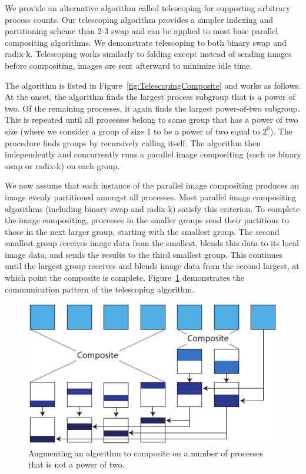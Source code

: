 \documentclass{sig-alternate}
\begin{document}
We provide an alternative algorithm called telescoping for supporting
arbitrary process counts.  Our telescoping algorithm provides a simpler
indexing and partitioning scheme than 2-3 swap and can be applied to most
base parallel compositing algorithms.  We demonstrate telescoping to both
binary swap and radix-k.  Telescoping works similarly to folding except
instead of sending images before compositing, images are sent afterward to
minimize idle time.

The  algorithm is listed in
Figure~\ref{fig:TelescopingComposite} and works as follows.  At the onset,
the algorithm finds the largest process subgroup that is a power of two.
Of the remaining processes, it again finds the largest power-of-two
subgroup.  This is repeated until all processes belong to some group that
has a power of two size (where we consider a group of size 1 to be a power
of two equal to $2^0$).  The  procedure finds
groups by recursively calling itself.  The algorithm then independently and
concurrently runs a parallel image compositing (such as binary swap or
radix-k) on each group.

We now assume that each instance of the parallel image compositing produces
an image evenly partitioned amongst all processes.  Most parallel image
compositing algorithms (including binary swap and radix-k) satisfy this
criterion.  To complete the image compositing, processes in the smaller
groups send their partitions to those in the next larger group, starting
with the smallest group.  The second smallest group receives image data
from the smallest, blends this data to its local image data, and sends the
results to the third smallest group.  This continues until the largest
group receives and blends image data from the second largest, at which
point the composite is complete.  Figure~\ref{fig:TelescopeDiagram}
demonstrates the communication pattern of the telescoping algorithm.

\begin{figure}[htbp]
  \centering
  \includegraphics{images/TelescopeDiagram}
  \caption{Augmenting an algorithm to composite on a number of processes
    that is not a power of two.}
  \label{fig:TelescopeDiagram}
\end{figure}
\end{document}
